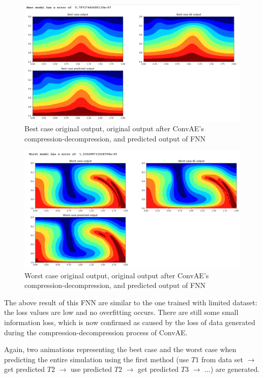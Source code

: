 \begin{figure}[H]
    \caption{Best case original output, original output after ConvAE's compression-decompression, and predicted output of FNN}
    \includegraphics[scale=0.5]{figures/mantle_convection_images/larger_dataset/FNN_Best.png}
\end{figure}

\begin{figure}[H]
    \caption{Worst case original output, original output after ConvAE's compression-decompression, and predicted output of FNN}
    \includegraphics[scale=0.5]{figures/mantle_convection_images/larger_dataset/FNN_Worst.png}
\end{figure}

The above result of this FNN are similar to the one trained with limited dataset: the loss values are low and no overfitting occurs. There are still some small information loss, which is now confirmed as caused by the loss of data generated during the compression-decompression process of ConvAE.

Again, two animations representing the best case and the worst case when predicting the entire simulation using the first method (use $T1$ from data set $\rightarrow$ get predicted $T2$ $\rightarrow$ use predicted $T2$ $\rightarrow$ get predicted $T3$ $\rightarrow$ ...) are generated.

